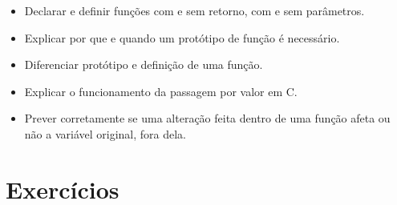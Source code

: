 \documentclass[12pt,a4paper,oneside]{extreport}
\begin{document}
\begin{objetivos}
\begin{itemize}
    \item Declarar e definir funções com e sem retorno, com e sem parâmetros.
    \item Explicar por que e quando um protótipo de função é necessário.
    \item Diferenciar protótipo e definição de uma função.
    \item Explicar o funcionamento da passagem por valor em C.
    \item Prever corretamente se uma alteração feita dentro de uma função afeta ou não a variável original, fora dela.
\end{itemize}
\end{objetivos}

\section*{Exercícios}
\end{document}
